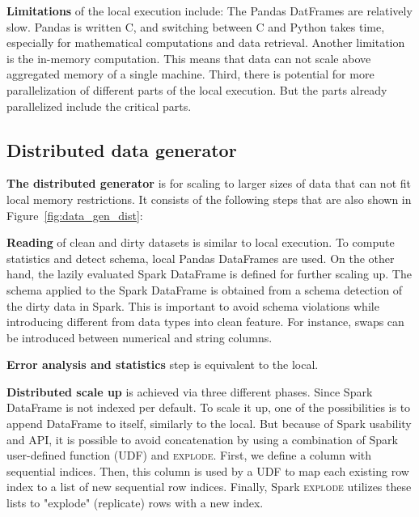 \textbf{Limitations} of the local execution include:
The Pandas DatFrames are relatively slow. Pandas is written C, and switching between C and Python takes time, especially for mathematical computations and data retrieval.
Another limitation is the in-memory computation. This means that data can not scale above aggregated memory of a single machine.
Third, there is potential for more parallelization of different parts of the local execution. But the parts already parallelized include the critical parts.


\subsection{Distributed data generator}
\label{sec:distributed_generator}

\textbf{The distributed generator} is for scaling to larger sizes of data that can not fit local memory restrictions.
It consists of the following steps that are also shown in Figure~\ref{fig:data_gen_dist}:


\textbf{Reading} of clean and dirty datasets is similar to local execution. 
To compute statistics and detect schema, local Pandas DataFrames are used. 
On the other hand, the lazily evaluated Spark DataFrame is defined for further scaling up.
The schema applied to the Spark DataFrame is obtained from a schema detection of the dirty data in Spark.
This is important to avoid schema violations while introducing different from data types into clean feature.  
For instance, swaps can be introduced between numerical and string columns.

\textbf{Error analysis and statistics} step is equivalent to the local.

\textbf{Distributed scale up} is achieved via three different phases. 
Since Spark DataFrame is not indexed per default. 
To scale it up, one of the possibilities is to append DataFrame to itself, similarly to the local.
But because of Spark usability and API, it is possible to avoid concatenation by using a combination of Spark user-defined function (\textsc{UDF}) and \textsc{explode}.
First, we define a column with sequential indices. 
Then, this column is used by a \textsc{UDF} to map each existing row index to a list of new sequential row indices.
Finally, Spark \textsc{explode} utilizes these lists to "explode" (replicate) rows with a new index.


